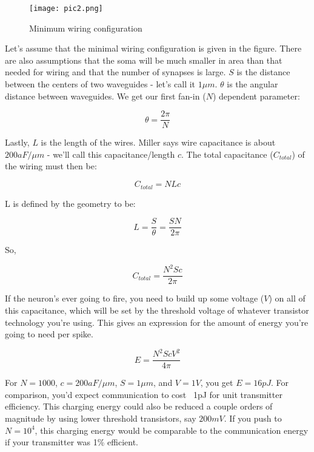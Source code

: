 \documentclass[twocolumn]{article}
\begin{document}
\begin{figure}[htb]
\begin{center}
   \texttt{[image: pic2.png]}
   \caption{Minimum wiring configuration}
\end{center}
\end{figure}

Let's assume that the minimal wiring configuration is given in the figure. There are also assumptions that the soma will be much smaller in area than that needed for wiring and that the number of synapses is large. $S$ is the distance between the centers of two waveguides - let's call it $1 \mu m$. $\theta$ is the angular distance between waveguides. We get our first fan-in ($N$) dependent parameter: 

\begin{equation}
    \theta = \frac{2\pi}{N}
\end{equation}

Lastly, $L$ is the length of the wires. Miller says wire capacitance is about $200 aF/\mu m$ - we'll call this capacitance/length $c$. The total capacitance ($C_{total}$) of the wiring must then be:

\begin{equation}
    C_{total} = NLc
\end{equation}

L is defined by the geometry to be:

\begin{equation}
    L = \frac{S}{\theta} = \frac{SN}{2\pi}
\end{equation}

So,

\begin{equation}
    C_{total} = \frac{N^{2}Sc}{2\pi}
\end{equation}


If the neuron's ever going to fire, you need to build up some voltage ($V$) on all of this capacitance, which will be set by the threshold voltage of whatever transistor technology you're using. This gives an expression for the  amount of energy you're going to need per spike.

\begin{equation}
    E = \frac{N^{2}ScV^{2}}{4\pi}
\end{equation}

For $N=1000$, $c = 200aF/\mu m$, $S=1\mu m$, and $V=1V$, you get $E = 16pJ$. For comparison, you'd expect communication to cost ~1pJ for unit transmitter efficiency. This charging energy could also be reduced a couple orders of magnitude by using lower threshold transistors, say $200 mV$. If you push to $N=10^{4}$, this charging energy would be comparable to the communication energy if your transmitter was 1\% efficient.
\end{document}
